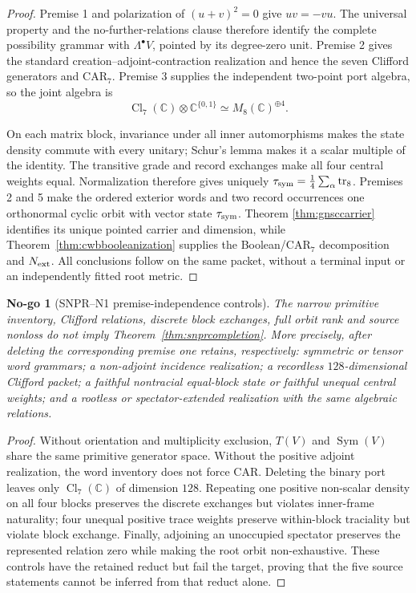 \documentclass[11pt,a4paper]{article}
\newtheorem{nogo}[definition]{No-go}
\theoremstyle{remark}
\begin{document}
\begin{proof}
Premise 1 and polarization of $(u+v)^2=0$ give $uv=-vu$.  The universal
property and the no-further-relations clause therefore identify the complete
possibility grammar with $\Lambda^\bullet V$, pointed by its degree-zero unit.
Premise 2 gives the standard creation--adjoint-contraction realization and
hence the seven Clifford generators and CAR$_7$.  Premise 3 supplies the
independent two-point port algebra, so the joint algebra is
\begin{equation}
 \operatorname{Cl}_7(\mathbb C)\otimes\mathbb C^{\{0,1\}}
 \simeq M_8(\mathbb C)^{\oplus4}.
 \label{eq:snpralgebra}
\end{equation}

On each matrix block, invariance under all inner automorphisms makes the state
density commute with every unitary; Schur's lemma makes it a scalar multiple
of the identity.  The transitive grade and record exchanges make all four
central weights equal.  Normalization therefore gives uniquely
$\tau_{\rm sym}=\frac14\sum_\alpha\operatorname{tr}_8$.  Premises 2 and 5
make the ordered exterior words and two record occurrences one orthonormal
cyclic orbit with vector state $\tau_{\rm sym}$.  Theorem
\ref{thm:gnsccarrier} identifies its unique pointed carrier and dimension,
while Theorem~\ref{thm:cwbbooleanization} supplies the Boolean/CAR$_7$
decomposition and $N_{\rm ext}$.  All conclusions follow on the same packet,
without a terminal input or an independently fitted root metric.
\end{proof}

\begin{nogo}[SNPR--N1 premise-independence controls]
The narrow primitive inventory, Clifford relations, discrete block exchanges,
full orbit rank and source nonloss do not imply
Theorem~\ref{thm:snprcompletion}.  More precisely, after deleting the
corresponding premise one retains, respectively: symmetric or tensor word
grammars; a non-adjoint incidence realization; a recordless
$128$-dimensional Clifford packet; a faithful nontracial equal-block state or
faithful unequal central weights; and a rootless or spectator-extended
realization with the same algebraic relations.
\label{nogo:snprindependence}
\end{nogo}

\begin{proof}
Without orientation and multiplicity exclusion, $T(V)$ and
$\operatorname{Sym}(V)$ share the same primitive generator space.  Without
the positive adjoint realization, the word inventory does not force CAR.
Deleting the binary port leaves only $\operatorname{Cl}_7(\mathbb C)$ of
dimension $128$.  Repeating one positive non-scalar density on all four
blocks preserves the discrete exchanges but violates inner-frame naturality;
four unequal positive trace weights preserve within-block traciality but
violate block exchange.  Finally, adjoining an unoccupied spectator preserves
the represented relation zero while making the root orbit non-exhaustive.
These controls have the retained reduct but fail the target, proving that the
five source statements cannot be inferred from that reduct alone.
\end{proof}
\end{document}
